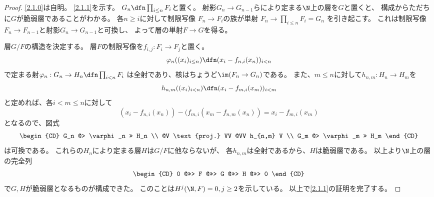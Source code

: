 \documentclass[uplatex,dvipdfmx]{jsarticle}
\begin{document}
\begin{proof}
  \ref{2.1.0}は自明。
  \ref{2.1.1}を示す。
  \(G_n \dfn \prod_{i\leq n}F_i\)と置く。
  射影\(G_n\to G_{n-1}\)らにより定まる\(\N\)上の層を\(G\)と置くと、
  構成からただちに\(G\)が脆弱層であることがわかる。
  各\(n\geq i\)に対して制限写像
  \(F_n \to F_i\)の族が単射
  \(F_n \to \prod_{i\leq n}F_i = G_n\)
  を引き起こす。
  これは制限写像\(F_n\to F_{n-1}\)と射影\(G_n\to G_{n-1}\)と可換し、
  よって層の単射\(F\to G\)を得る。

  層\(G/F\)の構造を決定する。
  層\(F\)の制限写像を\(f_{i,j}:F_i\to F_j\)と置く。
  \[
  \varphi_n ((x_i)_{i\leq n}) \dfn (x_i-f_{n,i}(x_n))_{i<n}
  \]
  で定まる射\(\varphi_n : G_n \to H_n \dfn \prod_{i<n}F_i\)
  は全射であり、核はちょうど\(\im(F_n\to G_n)\)である。
  また、\(m\leq n\)に対して\(h_{n,m}: H_n\to H_m\)を
  \[
  h_{n,m}((x_i)_{i<n}) \dfn (x_i - f_{m,i}(x_m))_{i<m}
  \]
  と定めれば、各\(i < m \leq n\)に対して
  \[
  (x_i - f_{n,i}(x_n)) - (f_{m,i}(x_m - f_{n,m}(x_n))
  = x_i - f_{m,i}(x_m)
  \]
  となるので、図式
  \[
  \begin{CD}
    G_n @> \varphi_n >> H_n \\
    @V \text{proj.} VV @VV h_{n,m} V \\
    G_m @> \varphi_m >> H_m
  \end{CD}
  \]
  は可換である。
  これらの\(H_n\)により定まる層\(H\)は\(G/F\)に他ならないが、
  各\(h_{n,m}\)は全射であるから、\(H\)は脆弱層である。
  以上より\(\N\)上の層の完全列
  \[
  \begin{CD}
    0 @>>> F @>>> G @>>> H @>>> 0
  \end{CD}
  \]
  で\(G,H\)が脆弱層となるものが構成できた。
  このことは\(H^j(\N,F) = 0 , j\geq 2\)を示している。
  以上で\ref{2.1.1}の証明を完了する。


\end{proof}
\end{document}
